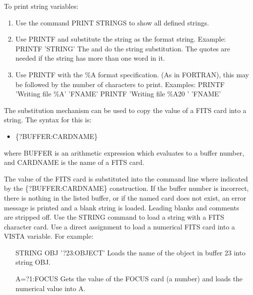 To print string variables:
\begin{enumerate}
  \item{Use the command PRINT STRINGS to show all defined strings.}
  \item{Use PRINTF and substitute the string as the format string.
       Example:\newline
       PRINTF '{STRING}'\newline
       The { and } do the string substitution.  The quotes are needed
       if the string has more than one word in it.}

  \item{Use PRINTF with the \%A format specification.  (As in FORTRAN),
       this may be followed by the number of characters to print.
       Examples:\newline
	PRINTF 'Writing file \%A' '{FNAME}'\newline
	PRINTF 'Writing file \%A20 ' '{FNAME}'}
\end{enumerate}

The substitution mechanism can be used to copy the value of a FITS card
into a string.  The syntax for this is:

\begin{itemize}
  \item{\{?BUFFER:CARDNAME\}}
\end{itemize}

where BUFFER is an arithmetic expression which evaluates to a buffer
number, and CARDNAME is the name of a FITS card.

The value of the FITS card is substituted into the command line where
indicated by the \{?BUFFER:CARDNAME\} construction.  If the buffer number
is incorrect, there is nothing in the listed buffer, or if the named card
does not exist, an error message is printed and a blank string is
loaded. Leading blanks and comments are stripped off. Use the STRING
command to load a string with a FITS character card. Use a direct
assignment to load a numerical FITS card into a VISTA variable.  For
example:
\begin{itemize}
  \item[STRING OBJ '{?23:OBJECT}'\hfill]{Loads the name of the object
       in buffer 23 into string {OBJ}.}
  \item[A={?1:FOCUS}\hfill]{Gets the value of the FOCUS
       card (a number) and loads the numerical value into A.}
\end{itemize}


